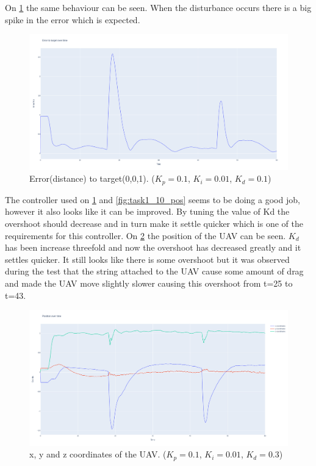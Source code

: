 \documentclass[conference]{IEEEtran}
\begin{document}
On \cref{fig:task1_10_err} the same behaviour can be seen. When the disturbance occurs there is a big spike in the error which is expected. 

\begin{figure}[hbtp]
	\centering
	\includegraphics[width=1.0\linewidth]{images/task1_10_err.png}
	\caption{Error(distance) to target(0,0,1). ($K_p = 0.1$, $K_i = 0.01$, $K_d = 0.1$)}
	\label{fig:task1_10_err}
\end{figure}

The controller used on \cref{fig:task1_10_err} and \cref{fig:task1_10_pos} seems to be doing a good job, however it also looks like it can be improved. By tuning the value of Kd the overshoot should decrease and in turn make it settle quicker which is one of the requirements for this controller. On \cref{fig:task1_11_pos} the position of the UAV can be seen. $K_d$ has been increase threefold and now the overshoot has decreased greatly and it settles quicker. It still looks like there is some overshoot but it was observed during the test that the string attached to the UAV cause some amount of drag and made the UAV move slightly slower causing this overshoot from t=25 to t=43.

\begin{figure}[hbtp]
	\centering
	\includegraphics[width=1.0\linewidth]{images/task1_11_pos.png}
	\caption{x, y and z coordinates of the UAV. ($K_p = 0.1$, $K_i = 0.01$, $K_d = 0.3$)}
	\label{fig:task1_11_pos}
\end{figure}
\end{document}
